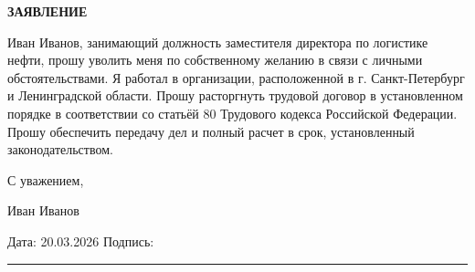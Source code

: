\documentclass[12pt]{article}
\begin{document}
\begin{center}
\textbf{\LARGE ЗАЯВЛЕНИЕ}
\end{center}

\vspace{1cm}

Иван Иванов, занимающий должность заместителя директора по логистике нефти, прошу уволить меня по собственному желанию в связи с личными обстоятельствами. Я работал в организации, расположенной в г. Санкт-Петербург и Ленинградской области. Прошу расторгнуть трудовой договор в установленном порядке в соответствии со статьёй 80 Трудового кодекса Российской Федерации. Прошу обеспечить передачу дел и полный расчет в срок, установленный законодательством.

\bigskip

С уважением,

Иван Иванов

\vfill

\noindent
Дата: 20.03.2026 \hfill Подпись: \rule{5cm}{0.4pt}
\end{document}
